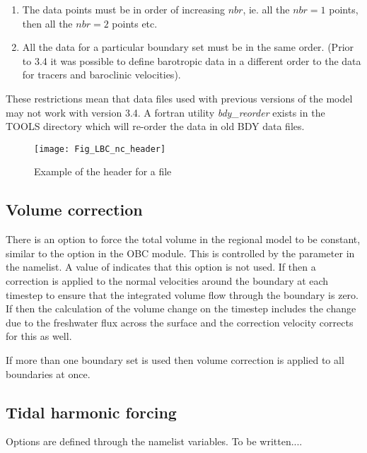 \documentclass[../main/NEMO_manual]{subfiles}
\begin{document}
\begin{enumerate}
\item The data points must be in order of increasing $nbr$,
  ie. all the $nbr=1$ points, then all the $nbr=2$ points etc.
\item All the data for a particular boundary set must be in the same order.
  (Prior to 3.4 it was possible to define barotropic data in a different order to
  the data for tracers and baroclinic velocities). 
\end{enumerate}

These restrictions mean that data files used with previous versions of the model may not work with version 3.4.
A fortran utility {\it bdy\_reorder} exists in the TOOLS directory which
will re-order the data in old BDY data files. 

\begin{figure}[!t]
  \begin{center}
    \texttt{[image: Fig\_LBC\_nc\_header]}
    \caption {
      \protect\label{fig:LBC_nc_header}
      Example of the header for a \protect{} file
    }
  \end{center}
\end{figure}

\subsection{Volume correction}
\label{subsec:BDY_vol_corr}

There is an option to force the total volume in the regional model to be constant,
similar to the option in the OBC module.
This is controlled  by the  parameter in the namelist.
A value of  indicates that this option is not used.
If  then a correction is applied to the normal velocities around the boundary at
each timestep to ensure that the integrated volume flow through the boundary is zero.
If  then the calculation of the volume change on
the timestep includes the change due to the freshwater flux across the surface and
the correction velocity corrects for this as well.

If more than one boundary set is used then volume correction is
applied to all boundaries at once.

\newpage
\subsection{Tidal harmonic forcing}
\label{subsec:BDY_tides}



Options are defined through the   namelist variables.
 To be written....

\biblio
\end{document}
